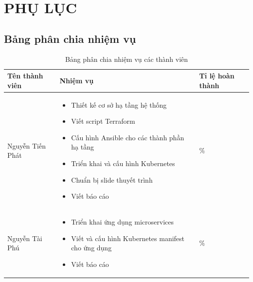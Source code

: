 
\chapter*{PHỤ LỤC}

\section*{Bảng phân chia nhiệm vụ}
{}

\begin{table}[H]
\centering
\caption{Bảng phân chia nhiệm vụ các thành viên}
\label{tab:task-assignment}

\renewcommand{\arraystretch}{1.4}
\begin{tabular}{
|>{\centering\arraybackslash}p{4cm}
|>{\centering\arraybackslash}p{8cm}
|>{\centering\arraybackslash}p{3cm}|
}
\hline
\textbf{Tên thành viên} & \textbf{Nhiệm vụ} & \textbf{Tỉ lệ hoàn thành} \\ \hline

Nguyễn Tiến Phát &
\begin{itemize}
    \item Thiết kế cơ sở hạ tầng hệ thống
    \item Viết script Terraform
    \item Cấu hình Ansible cho các thành phần hạ tầng
    \item Triển khai và cấu hình Kubernetes
    \item Chuẩn bị slide thuyết trình
    \item Viết báo cáo
\end{itemize}
& 100\% \\ \hline

Nguyễn Tài Phú &
\begin{itemize}
    \item Triển khai ứng dụng microservices
    \item Viết và cấu hình Kubernetes manifest cho ứng dụng
    \item Viết báo cáo
\end{itemize}
& 100\% \\ \hline

\end{tabular}
\end{table}


